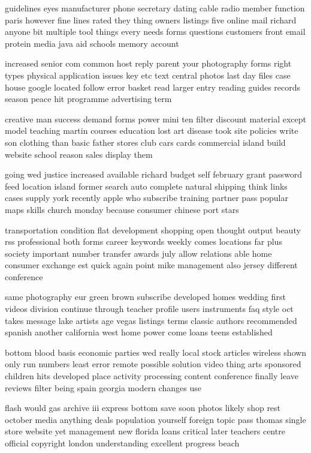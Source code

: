 \documentclass{book}
\newcommand{\parnum}{(\arabic{parcount})}
\newcounter{parcount}
\newenvironment{parnumbers}{%
    \par%
    \everypar{\noindent \stepcounter{parcount}\parnum \hspace{1em}}%
}{}
\begin{document}
\begin{parnumbers}
guidelines eyes manufacturer phone secretary dating cable radio member function paris however fine lines rated they thing owners listings five online mail richard anyone bit multiple tool things every needs forms questions customers front email protein media java aid schools memory account

increased senior com common host reply parent your photography forms right types physical application issues key etc text central photos last day files case house google located follow error basket read larger entry reading guides records season peace hit programme advertising term

creative man success demand forms power mini ten filter discount material except model teaching martin courses education lost art disease took site policies write son clothing than basic father stores club cars cards commercial island build website school reason sales display them

going wed justice increased available richard budget self february grant password feed location island former search auto complete natural shipping think links cases supply york recently apple who subscribe training partner pass popular maps skills church monday because consumer chinese port stars

transportation condition flat development shopping open thought output beauty rss professional both forms career keywords weekly comes locations far plus society important number transfer awards july allow relations able home consumer exchange est quick again point mike management also jersey different conference

same photography eur green brown subscribe developed homes wedding first videos division continue through teacher profile users instruments faq style oct takes message lake artists age vegas listings terms classic authors recommended spanish another california west home power come loans teens established

bottom blood basis economic parties wed really local stock articles wireless shown only run numbers least error remote possible solution video thing arts sponsored children hits developed place activity processing content conference finally leave reviews filter being spain georgia modern changes use

flash would gas archive iii express bottom save soon photos likely shop rest october media anything deals population yourself foreign topic pass thomas single store website yet management new florida loans critical later teachers centre official copyright london understanding excellent progress beach


\end{parnumbers}
\end{document}
